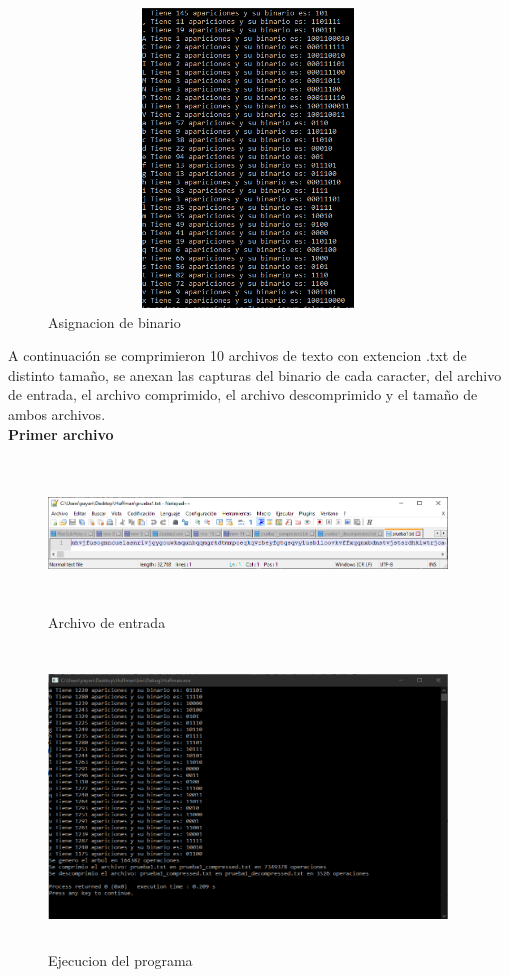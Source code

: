 \documentclass[spanish]{article}
\begin{document}
	\begin{figure}[H]
		\centering
		\includegraphics[width=400px,height=300px]{captura10}
		\caption{Asignacion de binario}
	\end{figure}
	A continuación se comprimieron 10 archivos de texto con extencion .txt de distinto tamaño, se anexan las capturas del binario de cada caracter, del archivo de entrada, el archivo comprimido, el archivo descomprimido y el tamaño de ambos archivos.\\
	\textbf{Primer archivo}
	\begin{figure}[H]
		\centering
		\includegraphics[width=400px,height=150px]{captura11}
		\caption{Archivo de entrada}
	\end{figure}
	\begin{figure}[H]
		\centering
		\includegraphics[width=400px,height=300px]{captura12}
		\caption{Ejecucion del programa}
	\end{figure}
\end{document}
